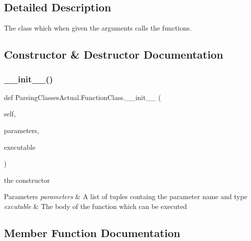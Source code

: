 \subsection{Detailed Description}
The class which when given the arguments calls the functions. 

\subsection{Constructor \& Destructor Documentation}
\mbox{\label{class_parsing_classes_actual_1_1_function_class_a4e12c7299b05b08c94ab18a69bf06c37}} 
\subsubsection{\texorpdfstring{\+\_\+\+\_\+init\+\_\+\+\_\+()}{\_\_init\_\_()}}
{\footnotesize\ttfamily def Parsing\+Classes\+Actual.\+Function\+Class.\+\_\+\+\_\+init\+\_\+\+\_\+ (\begin{DoxyParamCaption}\item[{}]{self,  }\item[{}]{parameters,  }\item[{}]{executable }\end{DoxyParamCaption})}



the constructor 


\begin{DoxyParams}{Parameters}
{\em parameters} & A list of tuples containg the parameter name and type \\
\hline
{\em excutable} & The body of the function which can be executed \\
\hline
\end{DoxyParams}


\subsection{Member Function Documentation}
\mbox{\label{class_parsing_classes_actual_1_1_function_class_a575c7098fc5b04f2df2791a137f596c4}} 
